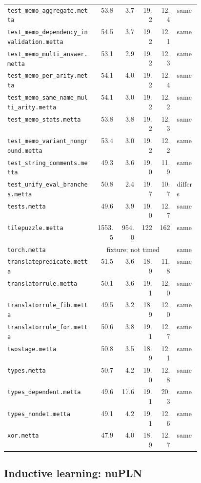 \begin{longtable}{@{}p{0.46\linewidth}rrrrl@{}}
\nolinkurl{test_memo_aggregate.metta} & 53.8 & 3.7 & 19.2 & 12.4 & same \\
\nolinkurl{test_memo_dependency_invalidation.metta} & 54.5 & 3.7 & 19.2 & 12.1 & same \\
\nolinkurl{test_memo_multi_answer.metta} & 53.1 & 2.9 & 19.2 & 12.3 & same \\
\nolinkurl{test_memo_per_arity.metta} & 54.1 & 4.0 & 19.2 & 12.4 & same \\
\nolinkurl{test_memo_same_name_multi_arity.metta} & 54.1 & 3.0 & 19.2 & 12.2 & same \\
\nolinkurl{test_memo_stats.metta} & 53.8 & 3.8 & 19.2 & 12.3 & same \\
\nolinkurl{test_memo_variant_nonground.metta} & 53.4 & 3.0 & 19.2 & 12.2 & same \\
\nolinkurl{test_string_comments.metta} & 49.3 & 3.6 & 19.0 & 11.9 & same \\
\nolinkurl{test_unify_eval_branches.metta} & 50.8 & 2.4 & 19.7 & 10.7 & differs \\
\nolinkurl{tests.metta} & 49.6 & 3.9 & 19.0 & 12.7 & same \\
\nolinkurl{tilepuzzle.metta} & 1553.5 & 954.0 & 122 & 162 & same \\
\nolinkurl{torch.metta} & \multicolumn{4}{c}{fixture; not timed} & same \\
\nolinkurl{translatepredicate.metta} & 51.5 & 3.6 & 18.9 & 11.8 & same \\
\nolinkurl{translatorrule.metta} & 50.1 & 3.6 & 19.1 & 12.0 & same \\
\nolinkurl{translatorrule_fib.metta} & 49.5 & 3.2 & 18.9 & 12.0 & same \\
\nolinkurl{translatorrule_for.metta} & 50.6 & 3.8 & 19.1 & 12.7 & same \\
\nolinkurl{twostage.metta} & 50.8 & 3.5 & 18.9 & 12.1 & same \\
\nolinkurl{types.metta} & 50.7 & 4.2 & 19.0 & 12.8 & same \\
\nolinkurl{types_dependent.metta} & 49.6 & 17.6 & 19.1 & 20.3 & same \\
\nolinkurl{types_nondet.metta} & 49.1 & 4.2 & 19.1 & 12.6 & same \\
\nolinkurl{xor.metta} & 47.9 & 4.0 & 18.9 & 12.7 & same \\
\end{longtable}
\endgroup

\subsection{Inductive learning: nuPLN}
\label{app:runtimes-ilp}

